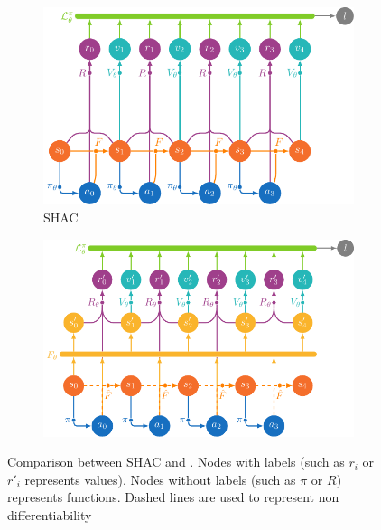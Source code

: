 \begin{figure}[t]
    \centering
    \begin{subfigure}[b]{0.45\textwidth}
        \includegraphics[width=\textwidth]{figs/shac.pdf}
        \caption{SHAC}
        \label{fig:shac}
    \end{subfigure}
    \begin{subfigure}[b]{0.45\textwidth}
        \includegraphics[width=\textwidth]{figs/shacpp.pdf}
        \caption{\fname{}}
        \label{fig:shacpp}
    \end{subfigure}
    \caption{Comparison between SHAC and \fname{}. Nodes with labels (such as $r_i$ or $r'_i$ represents values). Nodes without labels (such as $\pi$ or $R$) represents functions. Dashed lines are used to represent non differentiability}\label{fig:shac-shacpp}
\end{figure}


\section{\fname{}}

